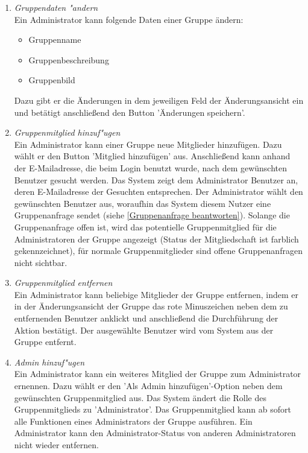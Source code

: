 \documentclass[parskip=full]{scrartcl}
\def\threedigits#1{%
  \ifnum#1<100 0\fi
  \ifnum#1<10 0\fi
  \number#1}
\begin{document}
\begin{enumerate}[label={\textbf{/F\protect\threedigits{\theenumi}0/}}, leftmargin=*, resume]

	\item \textit{Gruppendaten "andern}\label{Gruppendaten ändern}\\
	Ein Administrator kann folgende Daten einer Gruppe ändern:
	\begin{itemize}
	\item Gruppenname
	\item \colorbox{shadecolor}{Gruppenbeschreibung}
	\item \colorbox{shadecolor}{Gruppenbild}
	\end{itemize}
	Dazu gibt er die Änderungen in dem jeweiligen Feld der Änderungsansicht ein und betätigt anschließend den Button 'Änderungen speichern'.
	
	\item \textit{Gruppenmitglied hinzuf"ugen}\label{Mitglieder hinzufügen} \\
	Ein Administrator kann einer Gruppe neue Mitglieder hinzufügen. Dazu wählt er den Button 'Mitglied hinzufügen' aus. Anschließend kann anhand der E-Mailadresse, die beim Login benutzt wurde, nach dem gewünschten Benutzer gesucht werden. Das System zeigt dem Administrator Benutzer an, deren E-Mailadresse der Gesuchten entsprechen. Der Administrator wählt den gewünschten Benutzer aus, woraufhin das System diesem Nutzer eine Gruppenanfrage sendet (siehe \ref{Gruppenanfrage beantworten}). Solange die Gruppenanfrage offen ist, wird das potentielle Gruppenmitglied für die Administratoren der Gruppe angezeigt (Status der Mitgliedschaft ist farblich gekennzeichnet), für normale Gruppenmitglieder sind offene Gruppenanfragen nicht sichtbar.
	
	\item \textit{Gruppenmitglied entfernen}\label{Gruppenmitglied entfernen}\\
	Ein Administrator kann beliebige Mitglieder der Gruppe entfernen, indem er in der Änderungsansicht der Gruppe das rote Minuszeichen neben dem zu entfernenden Benutzer anklickt und anschließend die Durchführung der Aktion bestätigt. Der ausgewählte Benutzer wird vom System aus der Gruppe entfernt.
	
	\item \colorbox{shadecolor}{\textit{Admin hinzuf"ugen}}\label{Admin hinzufügen} \\
	Ein Administrator kann ein weiteres Mitglied der Gruppe zum Administrator ernennen. Dazu wählt er den 'Als Admin hinzufügen'-Option neben dem gewünschten Gruppenmitglied aus. Das System ändert die Rolle des Gruppenmitglieds zu 'Administrator'. Das Gruppenmitglied kann ab sofort alle Funktionen eines Administrators der Gruppe ausführen. Ein Administrator kann den Administrator-Status von anderen Administratoren nicht wieder entfernen.
	

\end{enumerate}
\end{document}
